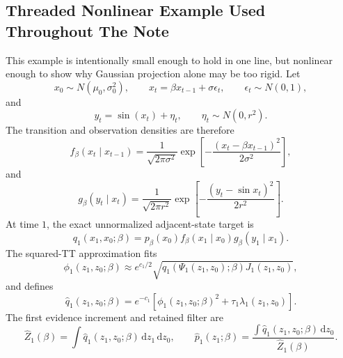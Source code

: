 \documentclass[11pt]{article}
\numberwithin{equation}{section}
\newcommand{\dd}{\,\mathrm d}
\begin{document}
\subsection{Threaded Nonlinear Example Used Throughout The Note}

This example is intentionally small enough to hold in one line, but nonlinear
enough to show why Gaussian projection alone may be too rigid.  Let
\begin{equation}
    x_0\sim N(\mu_0,\sigma_0^2),
    \qquad
    x_t=\beta x_{t-1}+\sigma\epsilon_t,
    \qquad
    \epsilon_t\sim N(0,1),
    \label{eq:p24-p23-e1}
\end{equation}
and
\begin{equation}
    y_t=\sin(x_t)+\eta_t,
    \qquad
    \eta_t\sim N(0,r^2).
    \label{eq:p24-p23-e2}
\end{equation}
The transition and observation densities are therefore
\begin{equation}
    f_\beta(x_t\mid x_{t-1})
    =
    \frac{1}{\sqrt{2\pi\sigma^2}}
    \exp\!\left[-\frac{(x_t-\beta x_{t-1})^2}{2\sigma^2}\right],
    \label{eq:p24-p23-e3}
\end{equation}
and
\begin{equation}
    g_\beta(y_t\mid x_t)
    =
    \frac{1}{\sqrt{2\pi r^2}}
    \exp\!\left[-\frac{(y_t-\sin x_t)^2}{2r^2}\right].
    \label{eq:p24-p23-e4}
\end{equation}
At time \(1\), the exact unnormalized adjacent-state target is
\begin{equation}
    q_1(x_1,x_0;\beta)
    =
    p_\beta(x_0)
    f_\beta(x_1\mid x_0)
    g_\beta(y_1\mid x_1).
    \label{eq:p24-p23-e5}
\end{equation}
The squared-TT approximation fits
\begin{equation}
    \phi_1(z_1,z_0;\beta)
    \approx
    e^{c_1/2}
    \sqrt{
    q_1(\Psi_1(z_1,z_0);\beta)
    J_1(z_1,z_0)},
    \label{eq:p24-p23-e6}
\end{equation}
and defines
\begin{equation}
    \widehat q_1(z_1,z_0;\beta)
    =
    e^{-c_1}\left[
    \phi_1(z_1,z_0;\beta)^2
    +
    \tau_1\lambda_1(z_1,z_0)
    \right].
    \label{eq:p24-p23-e7}
\end{equation}
The first evidence increment and retained filter are
\begin{equation}
    \widehat Z_1(\beta)
    =
    \int\widehat q_1(z_1,z_0;\beta)\dd z_1\dd z_0,
    \qquad
    \widehat p_1(z_1;\beta)
    =
    \frac{\int\widehat q_1(z_1,z_0;\beta)\dd z_0}
    {\widehat Z_1(\beta)}.
    \label{eq:p24-p23-e8}
\end{equation}
\end{document}
